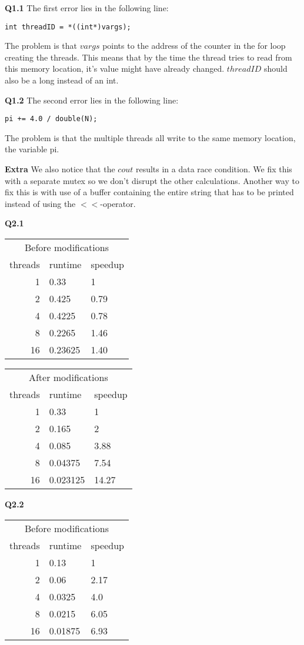 \documentclass[12pt]{report}
\begin{document}
\headheight 15pt
\lstset{language=C++}
\textbf{Q1.1} The first error lies in the following line:
\begin{lstlisting}
int threadID = *((int*)vargs);
\end{lstlisting}
The problem is that $vargs$ points to the address of the counter in the for loop creating the threads. This means that by the time the thread tries to read from this memory location, it's value might have already changed. $threadID$ should also be a long instead of an int.\par
\textbf{Q1.2} The second error lies in the following line: 
\begin{lstlisting}
pi += 4.0 / double(N);
\end{lstlisting}
The problem is that the multiple threads all write to the same memory location, the variable pi.\par
\textbf{Extra} We also notice that the $cout$ results in a data race condition. We fix this with a separate mutex so we don't disrupt the other calculations. Another way to fix this is with use of a buffer containing the entire string that has to be printed instead of using the $<<$-operator.\par
\textbf{Q2.1}\par
\begin{tabularx}{5.5cm}{r|l|l}
\multicolumn{3}{c}{Before modifications} \\
threads&runtime&speedup\\\hline
1&0.33&1\\
2&0.425&0.79\\
4&0.4225&0.78\\
8&0.2265&1.46\\
16&0.23625&1.40
\end{tabularx}\hspace{1cm}
\begin{tabularx}{5.5cm}{r|l|l}
\multicolumn{3}{c}{After modifications} \\
threads&runtime&speedup\\\hline
1&0.33&1\\
2&0.165&2\\
4&0.085&3.88\\
8&0.04375&7.54\\
16&0.023125&14.27
\end{tabularx}\par
\textbf{Q2.2}\par
\begin{tabularx}{5.5cm}{r|l|l}
\multicolumn{3}{c}{Before modifications} \\
threads&runtime&speedup\\\hline
1&0.13&1\\
2&0.06&2.17\\
4&0.0325&4.0\\
8&0.0215&6.05\\
16&0.01875&6.93
\end{tabularx}\hspace{1cm}
\end{document}
